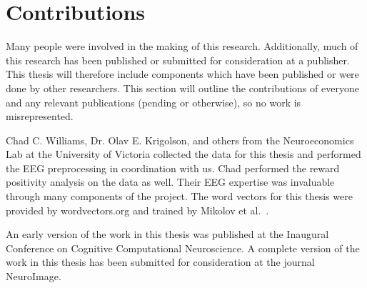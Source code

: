 \section{Contributions}

Many people were involved in the making of this research. Additionally, much of 
this research has been published or submitted for consideration at a publisher.  
This thesis will therefore include components which have been published or were 
done by other researchers. This section will outline the contributions of 
everyone and any relevant publications (pending or otherwise), so no work is 
misrepresented.

Chad C. Williams, Dr. Olav E. Krigolson, and others from the Neuroeconomics Lab 
at the University of Victoria collected the data for this thesis and performed 
the EEG preprocessing in coordination with us. Chad performed the reward 
positivity analysis on the data as well. Their EEG expertise was invaluable 
through many components of the project. The word vectors for this thesis were 
provided by wordvectors.org and trained by Mikolov et al.~\cite{Mikolov2013}.  

An early version of the work in this thesis was published at the Inaugural 
Conference on Cognitive Computational Neuroscience. A complete version of the 
work in this thesis has been submitted for consideration at the journal 
NeuroImage.
